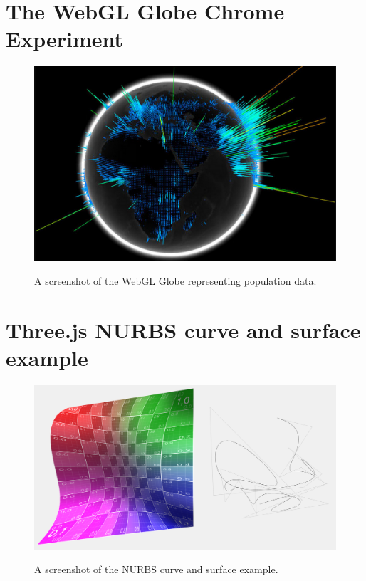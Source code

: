 \documentclass[a4paper]{article}
\begin{document}
	\newpage

		
	
	
	\newpage
	
	\begin{appendices}
	
		\section{The WebGL Globe Chrome Experiment} {
		\label{app:globe}
		
			\begin{figure}[H]
        		\href{https://www.chromeexperiments.com/globe}{\includegraphics[width=\textwidth]{images/globe}}
				\caption{A screenshot of the WebGL Globe representing population data. \citep{google2011globe}}
				\label{fig:webgl_globe}
			\end{figure}
		
		}
		
		\newpage
		
		\section{Three.js NURBS curve and surface example} {
		\label{app:nurbs}		
		
			\begin{figure}[H]
        		\href{http://threejs.org/examples/webgl_geometry_nurbs.html}{\includegraphics[width=\textwidth]{images/nurbs}}
				\caption{A screenshot of the NURBS curve and surface example.}
				\label{fig:nurbs}
			\end{figure}
		
}
\end{appendices}
\end{document}
